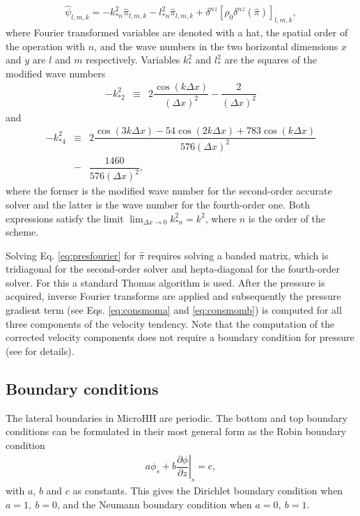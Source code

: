 \documentclass[gmd]{copernicus}
\begin{document}
\begin{eqnarray}
\widehat{\psi}_{l,m,k} = - k^2_{*n} \widehat{\pi}_{l,m,k} - l^2_{*n} \widehat{\pi}_{l,m,k}
+ \delta^{nz} \left[ \rho_0 \delta^{nz} \left( \widehat{\pi} \right) \right]_{l,m,k},\label{eq:presfourier}
\end{eqnarray}
where Fourier transformed variables are denoted with a hat, the spatial order of the operation with $n$, and the wave numbers in the two horizontal dimensions $x$ and $y$ are $l$ and $m$ respectively. Variables $k_*^2$ and $l_*^2$ are the squares of the modified wave numbers
\begin{eqnarray}
-k_{*2}^2 & \equiv & 2 \dfrac{\cos (k \Delta x)}{\left( \Delta x \right)^2} - \dfrac{2}{\left( \Delta x \right)^2}
\end{eqnarray}
and
\begin{eqnarray}
\nonumber
-k_{*4}^2 & \equiv & 2 \dfrac{\cos (3k \Delta x) - 54 \cos (2k \Delta x) + 783 \cos (k \Delta x)}
{576 \left( \Delta x \right)^2}\\
& - & \dfrac{1460}{576 \left( \Delta x \right)^2},
\end{eqnarray}
where the former is the modified wave number for the second-order accurate solver and the latter is the wave number for the fourth-order one. Both expressions satisfy the limit
$\lim_{\Delta x \rightarrow 0} k_{*n}^2 = k^2$, where $n$ is the order of the scheme.

Solving Eq. \ref{eq:presfourier} for $\widehat{\pi}$ requires solving a banded matrix, which is tridiagonal for the second-order solver and hepta-diagonal for the fourth-order solver. For this a standard Thomas algorithm is used. After the pressure is acquired, inverse Fourier transforms are applied and subsequently the pressure gradient term (see Eqs. \ref{eq:consmoma} and \ref{eq:consmomb}) is computed for all three components of the velocity tendency. Note that the computation of the corrected velocity components does not require a boundary condition for pressure (see \citet{Vreman2014} for details).

\subsection{Boundary conditions}
The lateral boundaries in MicroHH are periodic. The bottom and top boundary conditions can be formulated in their most general form as the Robin boundary condition
\begin{eqnarray}
a \phi_s + b \left.\dfrac{\partial \phi}{\partial z}\right|_s = c,
\end{eqnarray}
with $a$, $b$ and $c$ as constants. This gives the Dirichlet boundary condition when ${a=1,~b=0}$, and the Neumann boundary condition when ${a=0,~b=1}$. 
\end{document}
